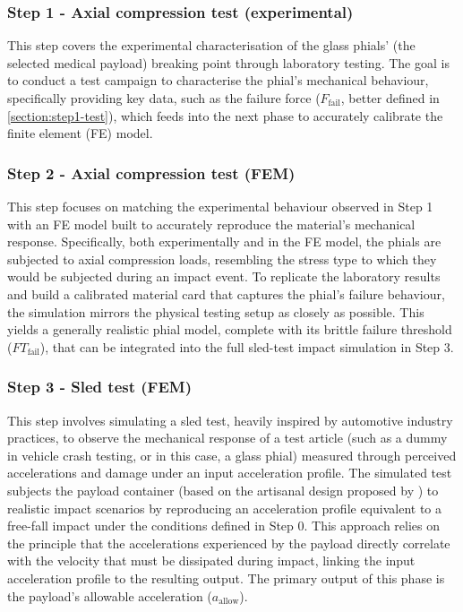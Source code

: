 \subsubsection{Step 1 - Axial compression test (experimental)}
This step covers the experimental characterisation of the glass phials' (the selected medical payload) breaking point through laboratory testing. The goal is to conduct a test campaign to characterise the phial's mechanical behaviour, specifically providing key data, such as the failure force ($F_{\text{fail}}$, better defined in \cref{section:step1-test}), which feeds into the next phase to accurately calibrate the finite element (FE) model.

\subsubsection{Step 2 - Axial compression test (FEM)}
This step focuses on matching the experimental behaviour observed in Step 1 with an FE model built to accurately reproduce the material's mechanical response. Specifically, both experimentally and in the FE model, the phials are subjected to axial compression loads, resembling the stress type to which they would be subjected during an impact event. To replicate the laboratory results and build a calibrated material card that captures the phial's failure behaviour, the simulation mirrors the physical testing setup as closely as possible. This yields a generally realistic phial model, complete with its brittle failure threshold ($FT_{\text{fail}}$), that can be integrated into the full sled-test impact simulation in Step 3.

\subsubsection{Step 3 - Sled test (FEM)}
This step involves simulating a sled test, heavily inspired by automotive industry practices, to observe the mechanical response of a test article (such as a dummy in vehicle crash testing, or in this case, a glass phial) measured through perceived accelerations and damage under an input acceleration profile. The simulated test subjects the payload container (based on the artisanal design proposed by \cite{Sivieri2021}) to realistic impact scenarios by reproducing an acceleration profile equivalent to a free-fall impact under the conditions defined in Step 0. This approach relies on the principle that the accelerations experienced by the payload directly correlate with the velocity that must be dissipated during impact, linking the input acceleration profile to the resulting output. The primary output of this phase is the payload's allowable acceleration ($a_{\text{allow}}$).

